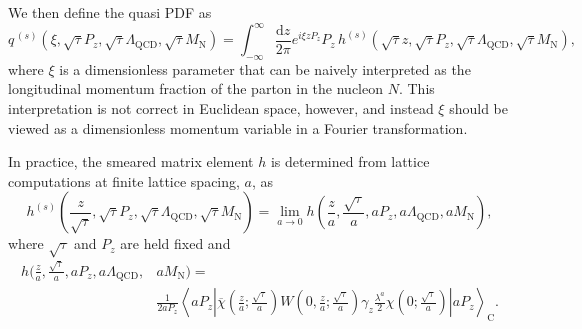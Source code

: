 We then define the quasi PDF 
\cite{Ji:2013dva,Ji:2014gla} as
\begin{equation}\label{eq:qpdfdef}
q^{\,(s)}\left(\xi,\sqrt{\tau}P_z,\sqrt{\tau}\Lambda_{\mathrm{QCD}}, 
\sqrt{\tau}M_\mathrm{N}\right) 
= 
\int_{-\infty}^\infty \frac{\mathrm{d}z}{2\pi} e^{i\xi z 
P_z} P_z\, 
h^{(s)}(\sqrt{\tau}z,\sqrt{\tau}P_z,\sqrt{\tau}\Lambda_{\mathrm{QCD}}, 
\sqrt{\tau}M_\mathrm{N}),
\end{equation}
where $\xi$ is a dimensionless parameter that can be naively interpreted as the 
longitudinal momentum fraction of the parton in the nucleon $N$.  This 
interpretation is not correct in Euclidean space, however, and instead $\xi$ 
should be viewed as a dimensionless momentum variable in a Fourier 
transformation.  

In practice, the smeared matrix element $h$ is determined from lattice 
computations at finite lattice spacing, $a$, as 
\begin{equation}\label{eq:hacont}
h^{(s)}\left(\frac{z}{\sqrt{\tau}},\sqrt{\tau}P_z,\sqrt{\tau}\Lambda_{\mathrm{
QCD}},
\sqrt { \tau }
M_\mathrm{N}\right) =  \lim_{a\to 0}
h\left(\frac{z}{a},\frac{\sqrt{\tau}}{a},aP_z,a\Lambda_{\mathrm{QCD}},aM_\mathrm
{N}
\right) ,
\end{equation}
where $\sqrt{\tau}$ and $P_z$ are held fixed and
\begin{align}
h\Big(\frac{z}{a},\frac{\sqrt{\tau}}{a},aP_z,a\Lambda_{\mathrm{QCD}},{} & 
aM_\mathrm{N}\Big) = \nonumber\\
{} & \frac{1}{2aP_z}
\left\langle 
aP_z \left| 
\overline{\chi}\left(\frac{z}{a};\frac{\sqrt{\tau}}{a}\right) 
W\left(0,\frac{z}{a};\frac{\sqrt{\tau}}{a}\right)\gamma_z\frac{\lambda^a}{2}
\chi\left(0;\frac { \sqrt{\tau}}{a} \right)\right| 
aP_z\right\rangle_\mathrm{C}.
\end{align}

